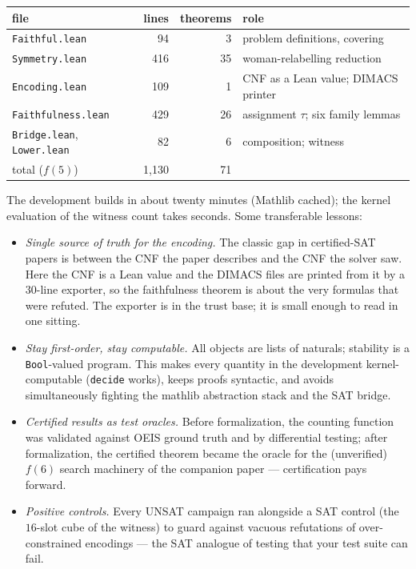 \documentclass[11pt]{article}
\begin{document}
\begin{center}
\begin{tabular}{lrrl}
\toprule
file & lines & theorems & role\\
\midrule
\texttt{Faithful.lean}      & 94   & 3  & problem definitions, covering\\
\texttt{Symmetry.lean}      & 416  & 35 & woman-relabelling reduction\\
\texttt{Encoding.lean}      & 109  & 1  & CNF as a Lean value; DIMACS printer\\
\texttt{Faithfulness.lean}  & 429  & 26 & assignment $\tau$; six family lemmas\\
\texttt{Bridge.lean}, \texttt{Lower.lean} & 82 & 6 & composition; witness\\
\midrule
total ($f(5)$)              & 1{,}130 & 71 & \\
\bottomrule
\end{tabular}
\end{center}

\noindent The development builds in about twenty minutes (Mathlib cached); the kernel
evaluation of the witness count takes seconds. Some transferable lessons:

\begin{itemize}
\item \emph{Single source of truth for the encoding.} The classic gap in certified-SAT
  papers is between the CNF the paper describes and the CNF the solver saw. Here the CNF
  is a Lean value and the DIMACS files are printed from it by a $30$-line exporter, so the
  faithfulness theorem is about the very formulas that were refuted. The exporter is in
  the trust base; it is small enough to read in one sitting.
\item \emph{Stay first-order, stay computable.} All objects are lists of naturals;
  stability is a \texttt{Bool}-valued program. This makes every quantity in the
  development kernel-computable (\texttt{decide} works), keeps proofs syntactic, and
  avoids simultaneously fighting the mathlib abstraction stack and the SAT bridge.
\item \emph{Certified results as test oracles.} Before formalization, the counting
  function was validated against OEIS ground truth and by differential testing; after
  formalization, the certified theorem became the oracle for the (unverified) $f(6)$
  search machinery of the companion paper --- certification pays forward.
\item \emph{Positive controls.} Every UNSAT campaign ran alongside a SAT control (the
  $16$-slot cube of the witness) to guard against vacuous refutations of over-constrained
  encodings --- the SAT analogue of testing that your test suite can fail.
\end{itemize}
\end{document}
